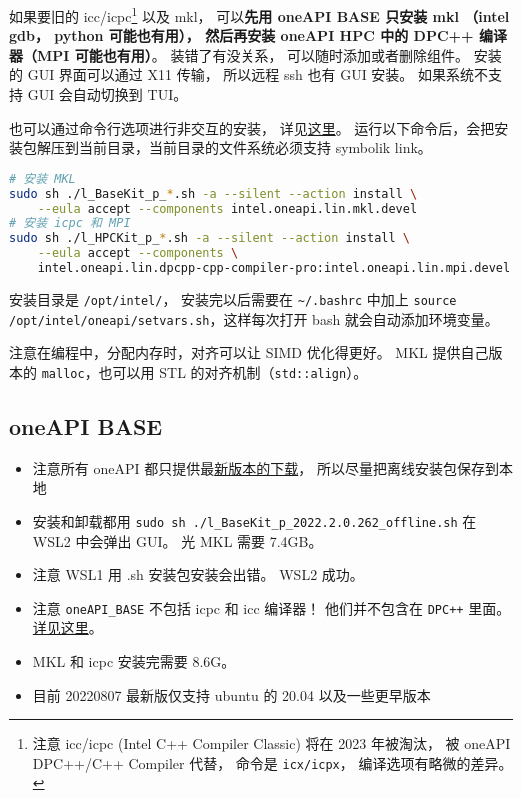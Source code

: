 

如果要旧的 icc/icpc\footnote{注意 icc/icpc (Intel C++ Compiler Classic) 将在 2023 年被淘汰， 被 oneAPI DPC++/C++ Compiler 代替， 命令是 \verb|icx/icpx|， 编译选项有略微的差异。} 以及 mkl， 可以\textbf{先用 oneAPI BASE 只安装 mkl （intel gdb， python 可能也有用）， 然后再安装 oneAPI HPC 中的 DPC++ 编译器（MPI 可能也有用）}。
装错了有没关系， 可以随时添加或者删除组件。 安装的 GUI 界面可以通过 X11 传输， 所以远程 ssh 也有 GUI 安装。 如果系统不支持 GUI 会自动切换到 TUI。

也可以通过命令行选项进行非交互的安装， 详见\href{https://www.intel.com/content/www/us/en/develop/documentation/installation-guide-for-intel-oneapi-toolkits-linux/top/installation/install-with-command-line.html#install-with-command-line}{这里}。 运行以下命令后，会把安装包解压到当前目录，当前目录的文件系统必须支持 symbolik link。
\begin{lstlisting}[language=bash]
# 安装 MKL
sudo sh ./l_BaseKit_p_*.sh -a --silent --action install \
    --eula accept --components intel.oneapi.lin.mkl.devel
# 安装 icpc 和 MPI
sudo sh ./l_HPCKit_p_*.sh -a --silent --action install \
    --eula accept --components \
    intel.oneapi.lin.dpcpp-cpp-compiler-pro:intel.oneapi.lin.mpi.devel
\end{lstlisting}

安装目录是 \verb`/opt/intel/`， 安装完以后需要在 \verb|~/.bashrc| 中加上 \verb|source /opt/intel/oneapi/setvars.sh|，这样每次打开 bash 就会自动添加环境变量。

注意在编程中，分配内存时，对齐可以让 SIMD 优化得更好。 MKL 提供自己版本的 \verb|malloc|，也可以用 STL 的对齐机制（\verb|std::align|）。

\subsection{oneAPI BASE}
\begin{itemize}
\item 注意所有 oneAPI 都只提供最\href{https://www.intel.com/content/www/us/en/developer/tools/oneapi/base-toolkit-download.html?operatingsystem=linux&distributions=webdownload&options=offline}{新版本的下载}， 所以尽量把离线安装包保存到本地
\item 安装和卸载都用 \verb`sudo sh ./l_BaseKit_p_2022.2.0.262_offline.sh` 在 WSL2 中会弹出 GUI。 光 MKL 需要 7.4GB。
\item 注意 WSL1 用 .sh 安装包安装会出错。 WSL2 成功。
\item 注意 \verb|oneAPI_BASE| 不包括 icpc 和 icc 编译器！ 他们并不包含在 \verb`DPC++` 里面。 \href{https://stackoverflow.com/questions/66527842/can-not-find-the-icc-compiler-after-having-installed-intel-oneapi-invoking-from}{详见这里}。
\item MKL 和 icpc 安装完需要 8.6G。
\item 目前 20220807 最新版仅支持 ubuntu 的 20.04 以及一些更早版本
\end{itemize}

